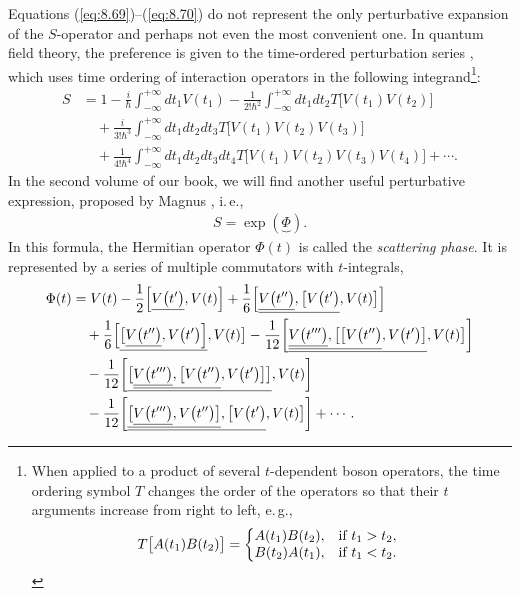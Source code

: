\documentclass[]{stefan1}
\newcommand{\lleft}{\left}
\newcommand{\rright}{\right}
\begin{document}
Equations (\ref{eq:8.69})--(\ref{eq:8.70}) do not represent the only
perturbative expansion of the $ S $-operator and perhaps not even the
most convenient one. In quantum field theory, the preference is given
to the time-ordered perturbation series 
\cite{book,Peskin}, which uses time ordering of interaction operators
in the following integrand\footnote{When applied to a product of
several $ t $-dependent boson operators, the time ordering symbol
 $ T $ changes the order of the operators so that
their $ t $ arguments increase from right to left, e.\,g.,
%
\begin{align}
T\bigl[A(t_{1})B(t_{2})\bigr] = \lleft\{ \begin{array}{@{}ll}
A(t_{1})B(t_{2}), &\mbox{if  } t_{1} > t_{2},
\\
B(t_{2})A(t_{1}), &\mbox{if  } t_{1} < t_{2}.
\end{array}
\rright. \label{eq:time-order}
\end{align}
}:
%
\begin{align}
S &= 1 - \frac{i}{\hbar }\int
_{-\infty }^{+\infty } dt_{1} V(t
_{1}) - \frac{1}{2!\hbar^{2}} \int
_{-\infty }^{+\infty } dt
_{1} dt_{2} T\bigl[V(t_{1}) V(t_{2})
\bigr]
\nonumber
\\
&\quad  +\frac{i}{3! \hbar^{3}} \int
_{-\infty }^{+\infty } dt_{1} dt
_{2} dt_{3}T\bigl[V(t_{1}) V(t_{2})
V(t_{3})\bigr]
\nonumber
\\
&\quad  +\frac{1}{4!\hbar^{4}} \int
_{-\infty }^{+\infty } dt_{1} dt
_{2} dt_{3} dt_{4}T\bigl[V(t_{1})
V(t_{2}) V(t_{3}) V(t_{4})\bigr] + \cdots .
\label{eq:F-D}
\end{align}
In the second volume of our book, we will find another useful
perturbative expression, proposed by Magnus
\cite{Magnus,Magnus2,Blanes08}, i.\,e., 
%
\begin{align}
S = \exp ( \underbrace{\Phi } ) \label{eq:8.71}.
\end{align}
In this formula, the Hermitian operator $ \Phi (t) $ is called the
\emph{scattering} \emph{phase}.\label{lb:phi-oper}
 It is represented by a series of
multiple commutators with $ t $-integrals,
%
\begin{align}
\Phi (t) &= V(t) - \frac{1}{2
} \Bigl[ \underline{V \bigl( t'
\bigr) },V(t) \Bigr] +\frac{1}{6} \Bigl[ \underline{\underline{V \bigl(
t'' \bigr) },\bigl[V \bigl( t' \bigr)
},V(t)\bigr] \Bigr]
\nonumber
\\
&\quad  +\frac{1}{6} \Bigl[ \underline{ \bigl[ \underline{V \bigl(
t'' \bigr) },V \bigl( t' \bigr) \Bigr]
},V(t) \bigr] -\frac{1}{12} \biggl[ \underline{\underline{\underline{V
\bigl( t''' \bigr) },\bigl[\bigl[V \bigl(
t'' \bigr) },V \bigl( t' \bigr)
\bigr]},V(t)\bigr] \biggr]
\nonumber
\\
&
\quad  -\frac{1}{12} \biggl[ \underline{\bigl[\underline{ \underline{V \bigl(
t''' \bigr) },\bigl[V \bigl(
t'' \bigr) },V \bigl( t' \bigr) \bigr]
\bigr]},V(t) \biggr]
\nonumber
\\
&\quad  -\frac{1}{12} \biggl[ \underline{\underline{\bigl[ \underline{V \bigl(
t''' \bigr) },V \bigl(
t'' \bigr) \bigr]},\bigl[V \bigl( t'
\bigr) },V(t)\bigr] \biggr] +\cdots . \label{eq:8.72}
\end{align}
\end{document}
